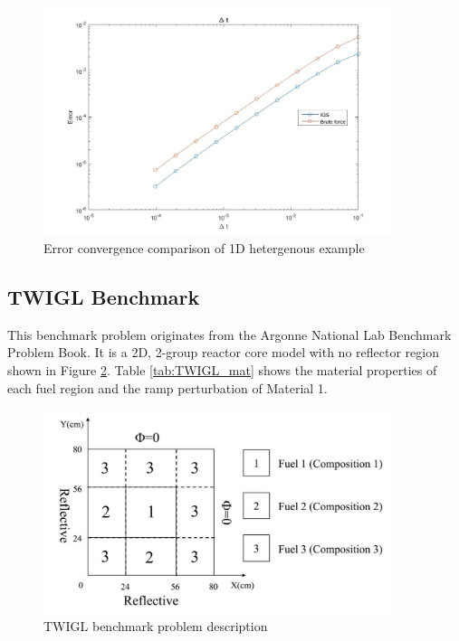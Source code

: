 \documentclass[12pt]{article}
\begin{document}
\begin{figure}[!htbp]
\centering
\includegraphics[width=4in]{figures/1D_het_convergence.jpg}
\caption{Error convergence comparison of 1D hetergenous example}
\label{fig:power}
\end{figure}

\subsection{TWIGL Benchmark}

This benchmark problem originates from the Argonne National Lab Benchmark Problem Book.  It is a 2D, 2-group reactor core model with no reflector region shown in Figure \ref{fig:TWIGL_reg}.  Table \ref{tab:TWIGL_mat} shows the material properties of each fuel region and the ramp perturbation of Material 1.

\begin{figure}[!htbp]
\begin{center}
\includegraphics[width=4in]{figures/TWIGL_regions.jpg}
\caption{TWIGL benchmark problem description}
\label{fig:TWIGL_reg}
\end{center}
\end{figure}
\end{document}
